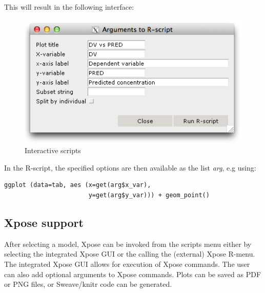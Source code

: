 {{{{\vspace{4pt}

\noindent This will result in the following interface:

\begin{figure}[H] \centering
    \includegraphics[scale=0.5]{images/interactive_scripts.png}
    \caption{Interactive scripts}
\end{figure}

\noindent In the R-script, the specified options are then available
as the list \textit{arg}, e.g using:

\begin{lstlisting}
ggplot (data=tab, aes (x=get(arg$x_var),
                       y=get(arg$y_var))) + geom_point()
\end{lstlisting}

\subsection{Xpose support}
After selecting a model, Xpose can be invoked from the scripts menu either by
selecting the integrated Xpose GUI or the calling the (external) Xpose R-menu.
The integrated Xpose GUI allows for execution of Xpose commands. The user can also add
optional arguments to Xpose commands.  Plots can be saved as PDF or
PNG files, or Sweave/knitr code can be generated.

}}}}
